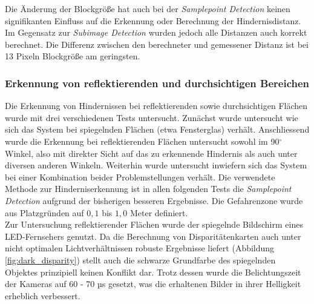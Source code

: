\noindent
Die Änderung der Blockgröße hat auch bei der \emph{Samplepoint Detection} keinen signifikanten Einfluss auf die Erkennung oder Berechnung der Hindernisdistanz. Im Gegensatz zur \emph{Subimage Detection} wurden jedoch alle Distanzen auch korrekt berechnet. Die Differenz zwischen den berechneter und gemessener Distanz ist bei 13 Pixeln Blockgröße am geringsten.


\subsubsection{Erkennung von reflektierenden und durchsichtigen Bereichen}
\label{subsec:test_reflection_translucency}

Die Erkennung von Hindernissen bei reflektierenden sowie durchsichtigen Flächen wurde mit drei verschiedenen Tests untersucht. Zunächst wurde untersucht wie sich das System bei spiegelnden Flächen (etwa Fensterglas) verhält. Anschliessend wurde die Erkennung bei reflektierenden Flächen untersucht sowohl im 90$^\circ$ Winkel, also mit direkter Sicht auf das zu erkennende Hindernis als auch unter diversen anderen Winkeln. Weiterhin wurde untersucht inwiefern sich das System bei einer Kombination beider Problemstellungen verhält. Die verwendete Methode zur Hinderniserkennung ist in allen folgenden Tests die \emph{Samplepoint Detection} aufgrund der bisherigen besseren Ergebnisse. Die Gefahrenzone wurde aus Platzgründen auf $0,1$ bis $1,0$ Meter definiert.\\

\noindent
Zur Untersuchung reflektierender Flächen wurde der spiegelnde Bildschirm eines LED-Fernsehers genutzt. Da die Berechnung von Disparitätenkarten auch unter nicht optimalen Lichtverhältnissen robuste Ergebnisse liefert (Abbildung \ref{fig:dark_disparity}) stellt auch die schwarze Grundfarbe des spiegelnden Objektes prinzipiell keinen Konflikt dar. Trotz dessen wurde die Belichtungszeit der Kameras auf 60 - 70 µs gesetzt, was die erhaltenen Bilder in ihrer Helligkeit erheblich verbessert.\\

